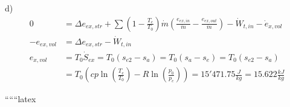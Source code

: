 d) 
\begin{align*}
0 &= \Delta e_{ex,str} + \sum \left( 1 - \frac{T_c}{T_0} \right) \dot{m} \left( \frac{e_{ex,in}}{\dot{m}} - \frac{e_{ex,out}}{\dot{m}} \right) - \dot{W}_{t,in} - \dot{e}_{x,vol} \\
-e_{ex,vol} &= \Delta e_{ex,str} - \dot{W}_{t,in} \\
e_{x,vol} &= T_0 \dot{S}_{ex} = T_0 \left( s_{e2} - s_{a} \right) = T_0 \left( s_{a} - s_{e} \right) = T_0 \left( s_{e2} - s_{a} \right) \\
&= T_0 \left( cp \ln \left( \frac{T_e}{T_0} \right) - R \ln \left( \frac{p_0}{p_c} \right) \right) = 15'471.75 \frac{J}{kg} = 15.622 \frac{kJ}{kg}
\end{align*}

``````latex